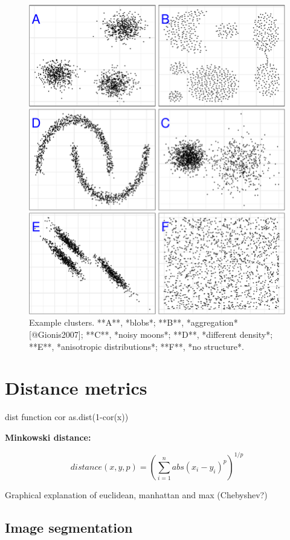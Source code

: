 \documentclass[]{book}
\theoremstyle{definition}
\theoremstyle{definition}
\theoremstyle{definition}
\theoremstyle{remark}
\begin{document}
\begin{figure}

{\centering \includegraphics[width=0.8\linewidth]{09-clustering_files/figure-latex/clusterTypes-1} 

}

\caption{Example clusters. **A**, *blobs*; **B**, *aggregation* [@Gionis2007]; **C**, *noisy moons*; **D**, *different density*; **E**, *anisotropic distributions*; **F**, *no structure*.}\label{fig:clusterTypes}
\end{figure}

\section{Distance metrics}\label{distance-metrics}

dist function cor as.dist(1-cor(x))

\textbf{Minkowski distance:}

\begin{equation}
  distance\left(x,y,p\right)=\left(\sum_{i=1}^{n} abs(x_i-y_i)^p\right)^{1/p}
  \label{eq:minkowski}
\end{equation}

Graphical explanation of euclidean, manhattan and max (Chebyshev?)

\subsection{Image segmentation}\label{image-segmentation}
\end{document}
